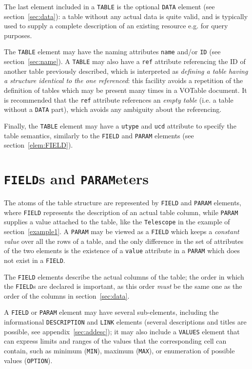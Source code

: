\documentclass[11pt,a4paper]{ivoa}
\def\Aref#1{section~\ref{#1}}
\def\Arefs#1{section~\ref{#1}}
\def\Arefx#1{appendix~\ref{#1}}
\let\fg=\color
\def\attr#1{{\tt{\fg{DarkRed}#1}}}
\def\elem#1{{\tt{\fg{DarkRed}#1}}}
\begin{document}
The last element included in a \elem{TABLE} is the optional \elem{DATA}
element (see \Aref{sec:data}): a table without any
actual data is quite valid, and is typically used to supply a complete
description of an existing resource e.g. for query purposes.

The \elem{TABLE} element may have the naming attributes \attr{name} and/or
\attr{ID} (see \Aref{sec:name}). A \elem{TABLE}
may also have a \attr{ref} attribute referencing the ID of another
table previously described, which is interpreted as
{\em defining a table having a structure identical to the one referenced}:
this facility avoids a repetition of the definition of tables which
may be present many times in a VOTable document.
It is recommended that the \attr{ref} attribute
references an {\em empty table} (i.e. a table without a
\elem{DATA} part), which avoids any ambiguity
about the referencing.

Finally, the \elem{TABLE} element may have a \attr{utype} and \attr{ucd}
attribute to specify the table semantics, similarly to  the \elem{FIELD} and
\elem{PARAM} elements (see \Aref{elem:FIELD}).

\section{\elem{FIELD}s and \elem{PARAM}eters}
\label{sec:field}

The atoms of the table structure are represented by \elem{FIELD} and
\elem{PARAM} elements, where \elem{FIELD} represents the description
of an actual table column, while \elem{PARAM} supplies a value
attached to the table, like the \attr{Telescope}
in the example of \Arefs{example1}. A \elem{PARAM} may be
viewed as a \elem{FIELD} which keeps a {\em constant value} over all
the rows of a table, and the only difference in the set of attributes
of the two elements
is the existence of a \attr{value} attribute in a \elem{PARAM}
which does not exist in a \elem{FIELD}.

The  \elem{FIELD} elements describe the actual columns of the table;
the order in which the \elem{FIELD}s are declared is important,
as this order {\em must} be the same one as the order of the
columns in \Aref{sec:data}.

A {\elem{FIELD}} or \elem{PARAM} element may have several sub-elements,
including the informational {\elem{DESCRIPTION}}
and {\elem{LINK}} elements (several descriptions and titles
are possible, see \Arefx{sec:addesc});
it may also include a {\elem{VALUES}} element
that can express limits and ranges of the values that the
corresponding cell can contain, such as minimum (\elem{MIN}),
maximum (\elem{MAX}), or
enumeration of possible values (\elem{OPTION}).
\end{document}
